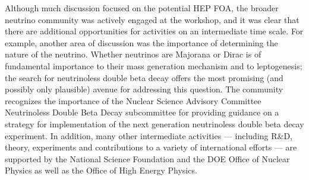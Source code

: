 Although much discussion focused on the potential HEP FOA, the broader
neutrino community was actively engaged at the workshop, and it was
clear that there are additional opportunities for activities on an
intermediate time scale.  For example, another area of discussion was
the importance of determining the nature of the neutrino.  Whether
neutrinos are Majorana or Dirac is of fundamental importance to their
mass generation mechanism and to leptogenesis; the search for
neutrinoless double beta decay offers the most promising (and possibly
only plausible) avenue for addressing this question.  The community
recognizes the importance of the Nuclear Science Advisory Committee
Neutrinoless Double Beta Decay subcommittee for providing guidance on a
strategy for implementation of the next generation neutrinoless double
beta decay experiment.  In addition, many other intermediate
activities --- including R\&D, theory, experiments and contributions
to a variety of international efforts --- are supported by the
National Science Foundation and the DOE Office of Nuclear Physics as
well as the Office of High Energy Physics.
